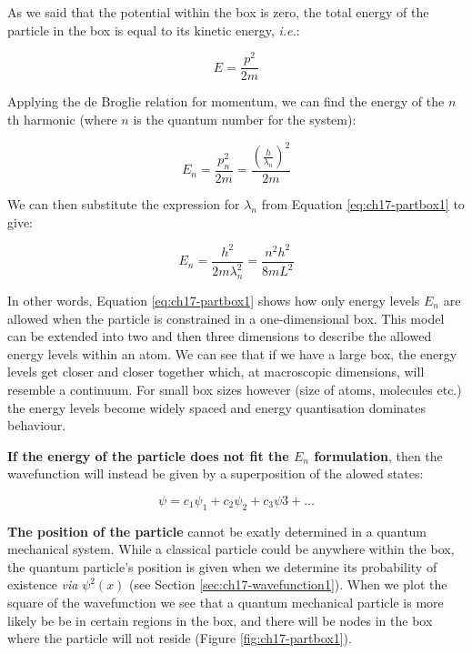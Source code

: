 \documentclass[
]{book}
\begin{document}
As we said that the potential within the box is zero, the total energy of the particle in the box is equal to its kinetic energy, \emph{i.e.}:

\begin{equation}
E = \frac{p^2}{2m}
\end{equation}

Applying the de Broglie relation for momentum, we can find the energy of the \(n\)th harmonic (where \(n\) is the quantum number for the system):

\begin{equation}
E_n = \frac{p_n^2}{2m} = \frac{\left(\frac{h}{\lambda_n}\right)^2}{2m}
\end{equation}

We can then substitute the expression for \(\lambda_n\) from Equation \eqref{eq:ch17-partbox1} to give:

\begin{equation}
E_n = \frac{h^2}{2m\lambda_n^2} = \frac{n^2 h^2}{8mL^2}
\label{eq:ch17-partbox2}
\end{equation}

In other words, Equation \eqref{eq:ch17-partbox1} shows how only energy levels \(E_n\) are allowed when the particle is constrained in a one-dimensional box. This model can be extended into two and then three dimensions to describe the allowed energy levels within an atom. We can see that if we have a large box, the energy levels get closer and closer together which, at macroscopic dimensions, will resemble a continuum. For small box sizes however (size of atoms, molecules etc.) the energy levels become widely spaced and energy quantisation dominates behaviour.

\textbf{If the energy of the particle does not fit the \(E_n\) formulation}, then the wavefunction will instead be given by a superposition of the alowed states:

\begin{equation}
\psi = c_1\psi_1 + c_2\psi_2 + c_3\psi3 + \dots
\end{equation}

\textbf{The position of the particle} cannot be exatly determined in a quantum mechanical system. While a classical particle could be anywhere within the box, the quantum particle's position is given when we determine its probability of existence \emph{via} \(\psi^2(x)\) (see Section \ref{sec:ch17-wavefunction1}). When we plot the square of the wavefunction we see that a quantum mechanical particle is more likely be be in certain regions in the box, and there will be nodes in the box where the particle will not reside (Figure \ref{fig:ch17-partbox1}).
\end{document}
